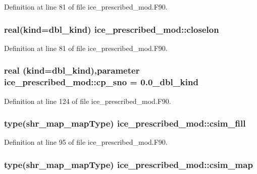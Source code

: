 Definition at line 81 of file ice\_\-prescribed\_\-mod.F90.\hypertarget{namespaceice__prescribed__mod_a0a932ccb360a743d8d05b685438cce6f}{
\subsubsection[{closelon}]{\setlength{\rightskip}{0pt plus 5cm}real(kind=dbl\_\-kind) {\bf ice\_\-prescribed\_\-mod::closelon}}}
\label{namespaceice__prescribed__mod_a0a932ccb360a743d8d05b685438cce6f}


Definition at line 81 of file ice\_\-prescribed\_\-mod.F90.\hypertarget{namespaceice__prescribed__mod_a9a106a2104e57fea97c1ddf91ffb9c0c}{
\subsubsection[{cp\_\-sno}]{\setlength{\rightskip}{0pt plus 5cm}real (kind=dbl\_\-kind),parameter {\bf ice\_\-prescribed\_\-mod::cp\_\-sno} = 0.0\_\-dbl\_\-kind}}
\label{namespaceice__prescribed__mod_a9a106a2104e57fea97c1ddf91ffb9c0c}


Definition at line 124 of file ice\_\-prescribed\_\-mod.F90.\hypertarget{namespaceice__prescribed__mod_a9cc059c1adaefc7ef43aa8ccf9f774ea}{
\subsubsection[{csim\_\-fill}]{\setlength{\rightskip}{0pt plus 5cm}type(shr\_\-map\_\-mapType) {\bf ice\_\-prescribed\_\-mod::csim\_\-fill}}}
\label{namespaceice__prescribed__mod_a9cc059c1adaefc7ef43aa8ccf9f774ea}


Definition at line 95 of file ice\_\-prescribed\_\-mod.F90.\hypertarget{namespaceice__prescribed__mod_ada89f7f5c26e2923f8fab5f837979bd9}{
\subsubsection[{csim\_\-map}]{\setlength{\rightskip}{0pt plus 5cm}type(shr\_\-map\_\-mapType) {\bf ice\_\-prescribed\_\-mod::csim\_\-map}}}
\label{namespaceice__prescribed__mod_ada89f7f5c26e2923f8fab5f837979bd9}


